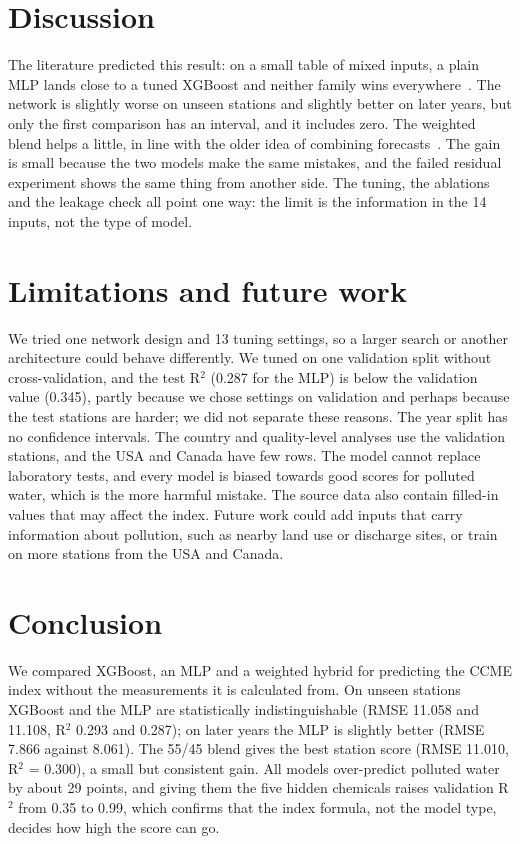 \documentclass[conference]{IEEEtran}
\begin{document}
\section{Discussion}
The literature predicted this result: on a small table of mixed inputs, a plain MLP lands close to a tuned XGBoost and neither family wins everywhere~\cite{gorishniy2021,mcelfresh2023}. The network is slightly worse on unseen stations and slightly better on later years, but only the first comparison has an interval, and it includes zero. The weighted blend helps a little, in line with the older idea of combining forecasts~\cite{bates1969,shwartz2022}. The gain is small because the two models make the same mistakes, and the failed residual experiment shows the same thing from another side. The tuning, the ablations and the leakage check all point one way: the limit is the information in the 14 inputs, not the type of model.

\section{Limitations and future work}
We tried one network design and 13 tuning settings, so a larger search or another architecture could behave differently. We tuned on one validation split without cross-validation, and the test R$^2$ (0.287 for the MLP) is below the validation value (0.345), partly because we chose settings on validation and perhaps because the test stations are harder; we did not separate these reasons. The year split has no confidence intervals. The country and quality-level analyses use the validation stations, and the USA and Canada have few rows. The model cannot replace laboratory tests, and every model is biased towards good scores for polluted water, which is the more harmful mistake. The source data also contain filled-in values that may affect the index. Future work could add inputs that carry information about pollution, such as nearby land use or discharge sites, or train on more stations from the USA and Canada.

\section{Conclusion}
We compared XGBoost, an MLP and a weighted hybrid for predicting the CCME index without the measurements it is calculated from. On unseen stations XGBoost and the MLP are statistically indistinguishable (RMSE 11.058 and 11.108, R$^2$ 0.293 and 0.287); on later years the MLP is slightly better (RMSE 7.866 against 8.061). The 55/45 blend gives the best station score (RMSE 11.010, R$^2$ = 0.300), a small but consistent gain. All models over-predict polluted water by about 29 points, and giving them the five hidden chemicals raises validation R$^2$ from 0.35 to 0.99, which confirms that the index formula, not the model type, decides how high the score can go.


\end{document}
